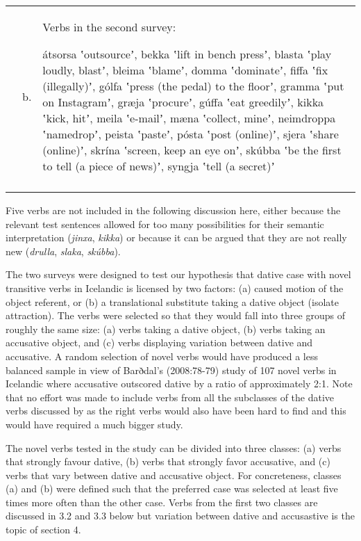 \tabletail{}
\tablelasttail{}
\begin{tabularx}{\textwidth}{XXX} & b. & Verbs in the second survey: 
\lsptoprule

átsorsa ʽoutsourceʼ, bekka ʽlift in bench pressʼ, blasta ʽplay loudly, blastʼ, bleima ʽblameʼ, domma ʽdominateʼ, fiffa ʽfix (illegally)ʼ, gólfa ʽpress (the pedal) to the floorʼ, gramma ʽput on Instagramʼ, græja ʽprocureʼ, gúffa ʽeat greedilyʼ, kikka ʽkick, hitʼ, meila ʽe-mailʼ, mæna ʽcollect, mineʼ, neimdroppa ʽnamedropʼ, peista ʽpasteʼ, pósta ʽpost (online)ʼ, sjera ʽshare (online)ʼ, skrína ʽscreen, keep an eye onʼ, skúbba ʽbe the first to tell (a piece of news)ʼ, syngja ʽtell (a secret)ʼ\\
\lspbottomrule
\end{tabularx}
Five verbs are not included in the following discussion here, either because the relevant test sentences allowed for too many possibilities for their semantic interpretation (\textit{jinxa}, \textit{kikka}) or because it can be argued that they are not really new  (\textit{drulla}, \textit{slaka}, \textit{skúbba}). 

\begin{styleFootnote}
The two surveys were designed to test our hypothesis that dative case with novel transitive verbs in Icelandic is licensed by two factors: (a) caused motion of the object referent, or (b) a translational substitute taking a dative object (isolate attraction). The verbs were selected so that they would fall into three groups of roughly the same size: (a) verbs taking a dative object, (b) verbs taking an accusative object, and (c) verbs displaying variation between dative and accusative. A random selection of novel verbs would have produced a less balanced sample in view of Barðdal’s (2008:78-79) study of 107 novel verbs in Icelandic where accusative outscored dative by a ratio of approximately 2:1. Note that no effort was made to include verbs from all the subclasses of the dative verbs discussed by \citet{Maling2002} as the right verbs would also have been hard to find and this would have required a much bigger study.
\end{styleFootnote}

The novel verbs tested in the study can be divided into three classes: (a) verbs that strongly favour dative, (b) verbs that strongly favor accusative, and (c) verbs that vary between dative and accusative object. For concreteness, classes (a) and (b) were defined such that the preferred case was selected at least five times more often than the other case. Verbs from the first two classes are discussed in 3.2 and 3.3 below but variation between dative and accusastive is the topic of section 4.

